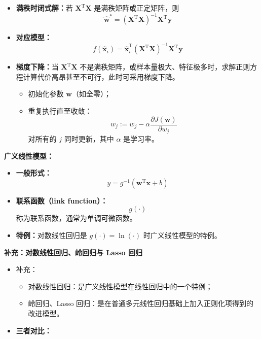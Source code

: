 \documentclass[../main.tex]{subfiles}
\begin{document}
\begin{enumerate}
{\begin{itemize}
        \item \textbf{满秩时闭式解：}若 $\mathbf{X}^{\mathrm{T}}\mathbf{X}$ 是满秩矩阵或正定矩阵，则
        $$
        \hat{\mathbf{w}}^{*}=(\mathbf{X}^{\mathrm{T}}\mathbf{X})^{-1}\mathbf{X}^{\mathrm{T}}\mathbf{y}
        $$
        
        \item \textbf{对应模型：}
        $$
        f(\hat{\mathbf{x}}_i)=\hat{\mathbf{x}}_i^{\mathrm{T}}(\mathbf{X}^{\mathrm{T}}\mathbf{X})^{-1}\mathbf{X}^{\mathrm{T}}\mathbf{y}
        $$
        
        \item \textbf{梯度下降：}当 $\mathbf{X}^{\mathrm{T}}\mathbf{X}$ 不是满秩矩阵，或样本量极大、特征极多时，求解正则方程计算代价高昂甚至不可行，此时可采用梯度下降。
        \begin{itemize}
            \item 初始化参数 $\mathbf{w}$（如全零）；
            \item 重复执行直至收敛：
            $$
            w_j:=w_j-\alpha\frac{\partial J(\mathbf{w})}{\partial w_j}
            $$
            对所有的 $j$ 同时更新，其中 $\alpha$ 是学习率。
        \end{itemize}
    \end{itemize}

    \item \textbf{广义线性模型：}
    \begin{itemize}
        \item \textbf{一般形式：}
        $$
        y=g^{-1}(\mathbf{w}^{\mathrm{T}}\mathbf{x}+b)
        $$
        
        \item \textbf{联系函数（link function）：}
        $$
        g(\cdot)
        $$
        称为联系函数，通常为单调可微函数。
        
        \item \textbf{特例：}对数线性回归是 $g(\cdot)=\ln(\cdot)$ 时广义线性模型的特例。
    \end{itemize}
        \item \textbf{补充：对数线性回归、岭回归与 Lasso 回归}
\begin{itemize}
    \item 补充：
    \begin{itemize}
        \item 对数线性回归：是广义线性模型在线性回归中的一个特例；
        \item 岭回归、Lasso 回归：是在普通多元线性回归基础上加入正则化项得到的改进模型。
    \end{itemize}
    \item \textbf{三者对比：}
    

\end{itemize}}
\end{enumerate}
\end{document}
